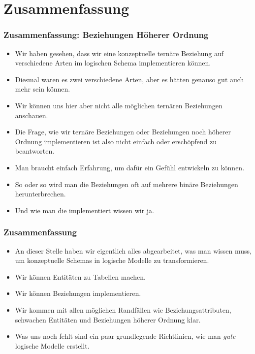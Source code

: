 \documentclass[aspectratio=169,mathserif,notheorems]{beamer}%
\begin{document}
\section{Zusammenfassung}%
%
\begin{frame}%
\frametitle{Zusammenfassung: Beziehungen Höherer Ordnung}%
\begin{itemize}%
\item Wir haben gesehen, dass wir eine konzeptuelle ternäre Beziehung auf verschiedene Arten im logischen Schema implementieren können.%
%
\item<2-> Diesmal waren es zwei verschiedene Arten, aber es hätten genauso gut auch mehr sein können.%
%
\item<3-> Wir können uns hier aber nicht alle möglichen ternären Beziehungen anschauen.%
%
\item<4-> Die Frage, wie wir ternäre Beziehungen oder Beziehungen noch höherer Ordnung implementieren ist also nicht einfach oder erschöpfend zu beantworten.%
%
\item<5-> Man braucht einfach Erfahrung, um dafür ein Gefühl entwickeln zu können.%
%
\item<6-> So oder so wird man die Beziehungen oft auf mehrere binäre Beziehungen herunterbrechen.%
%
\item<7-> Und wie man die implementiert wissen wir ja.%
\end{itemize}%
\end{frame}%
%
\begin{frame}%
\frametitle{Zusammenfassung}%
\begin{itemize}%
\item An dieser Stelle haben wir eigentlich alles abgearbeitet, was man wissen muss, um konzeptuelle Schemas in logische Modelle zu transformieren.%
%
\item<2-> Wir können Entitäten zu Tabellen machen.%
%
\item<3-> Wir können Beziehungen implementieren.%
%
\item<4-> Wir kommen mit allen möglichen Randfällen wie Beziehungsattributen, schwachen Entitäten und Beziehungen höherer Ordnung klar.%
%
\item<6-> Was uns noch fehlt sind ein paar grundlegende Richtlinien, wie man \emph{gute} logische Modelle erstellt.%
\end{itemize}%
\end{frame}%
\endPresentation%
\end{document}
